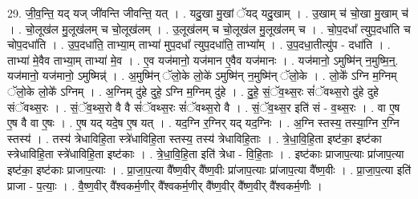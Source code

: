\documentclass[17pt]{extarticle}
\begin{document}
29. जी॒व॒न्ति॒ यद् यज् जी॑वन्ति जीवन्ति॒ यत् । . यदु॒खा मु॒खां ॅयद् यदु॒खाम् । . उ॒खाम् च॑ चो॒खा मु॒खाम् च॑ । . चो॒लूख॑ल मु॒लूख॑लम् च चो॒लूख॑लम् । . उ॒लूख॑लम् च चो॒लूख॑ल मु॒लूख॑लम् च । . चो॒प॒दधा᳚ त्युप॒दधा॑ति च चोप॒दधा॑ति । . उ॒प॒दधा॑ति॒ ताभ्या॒म् ताभ्या॑ मुप॒दधा᳚ त्युप॒दधा॑ति॒ ताभ्या᳚म् । . उ॒प॒दधा॒तीत्यु॑प - दधा॑ति । . ताभ्या॑ मे॒वैव ताभ्या॒म् ताभ्या॑ मे॒व । . ए॒व यज॑मानो॒ यज॑मान ए॒वैव यज॑मानः । . यज॑मानो॒ ऽमुष्मि॑न् न॒मुष्मि॒न्॒. यज॑मानो॒ यज॑मानो॒ ऽमुष्मिन्न्॑ । . अ॒मुष्मि॑न् ॅलो॒के लो॒के॑ ऽमुष्मि॑न् न॒मुष्मि॑न् ॅलो॒के । . लो॒के᳚ ऽग्नि म॒ग्निम् ॅलो॒के लो॒के᳚ ऽग्निम् । . अ॒ग्निम् दु॑हे दुहे॒ ऽग्नि म॒ग्निम् दु॑हे । . दु॒हे॒ सं॒ॅव॒थ्स॒रः सं॑ॅवथ्स॒रो दु॑हे दुहे संॅवथ्स॒रः । . सं॒ॅव॒थ्स॒रो वै वै सं॑ॅवथ्स॒रः सं॑ॅवथ्स॒रो वै । . सं॒ॅव॒थ्स॒र इति॑ सं - व॒थ्स॒रः । . वा ए॒ष ए॒ष वै वा ए॒षः । . ए॒ष यद् यदे॒ष ए॒ष यत् । . यद॒ग्नि र॒ग्निर् यद् यद॒ग्निः । . अ॒ग्नि स्तस्य॒ तस्या॒ग्नि र॒ग्नि स्तस्य॑ । . तस्य॑ त्रेधाविहि॒ता स्त्रे॑धाविहि॒ता स्तस्य॒ तस्य॑ त्रेधाविहि॒ताः । . त्रे॒धा॒वि॒हि॒ता इष्ट॑का॒ इष्ट॑का स्त्रेधाविहि॒ता स्त्रे॑धाविहि॒ता इष्ट॑काः । . त्रे॒धा॒वि॒हि॒ता इति॑ त्रेधा - वि॒हि॒ताः । . इष्ट॑काः प्राजाप॒त्याः प्रा॑जाप॒त्या इष्ट॑का॒ इष्ट॑काः प्राजाप॒त्याः । . प्रा॒जा॒प॒त्या वै᳚ष्ण॒वीर् वै᳚ष्ण॒वीः प्रा॑जाप॒त्याः प्रा॑जाप॒त्या वै᳚ष्ण॒वीः । . प्रा॒जा॒प॒त्या इति॑ प्राजा - प॒त्याः॒ । . वै॒ष्ण॒वीर् वै᳚श्वकर्म॒णीर् वै᳚श्वकर्म॒णीर् वै᳚ष्ण॒वीर् वै᳚ष्ण॒वीर् वै᳚श्वकर्म॒णीः । \newline
\end{document}
